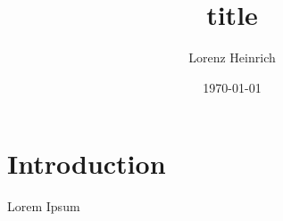 \documentclass{article}
\title{title}
\author{Lorenz Heinrich}
\date{\today}
\begin{document}
  \maketitle
  \newpage
  \tableofcontents

  \section{Introduction}
  Lorem Ipsum
\end{document}
